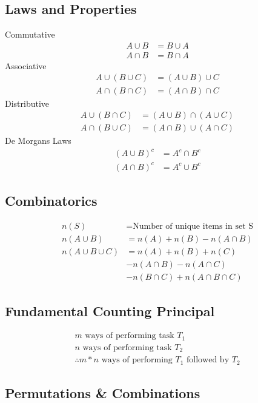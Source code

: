 \documentclass[]{article}
\begin{document}
	\subsection*{Laws and Properties}
	Commutative
	\begin{align*}
		A \cup B &= B \cup A \\
		A \cap B &= B \cap A
	\end{align*}
	Associative
	\begin{align*}
		A \cup (B \cup C) &= (A \cup B) \cup C \\
		A \cap (B \cap C) &= (A \cap B) \cap C
	\end{align*}
	Distributive
	\begin{align*}
		A \cup (B \cap C) &= (A \cup B) \cap (A \cup C) \\
		A \cap (B \cup C) &= (A \cap B) \cup (A \cap C)
	\end{align*}
	De Morgans Laws
	\begin{align*}
		(A \cup B)^c &= A^c \cap B^c \\
		(A \cap B)^c &= A^c \cup B^c
	\end{align*}
	
	\subsection*{Combinatorics}
	\begin{align*}
		n(S) &= \text{Number of unique items in set S} \\
		n(A \cup B) &= n(A) + n(B) - n(A \cap B) \\
		n(A \cup B \cup C) &=  n(A) + n(B) + n(C) \\
										 & - n(A \cap B) - n(A \cap C) \\
										 & - n(B \cap C) + n(A \cap B \cap C)
	\end{align*}

	\subsection*{Fundamental Counting Principal}
	
	\begin{align*}
		m \text{ ways of performing task } T_1 \\
		n \text{ ways of performing task } T_2 \\
		\therefore m * n \text{ ways of performing } T_1 \text{ followed by } T_2
	\end{align*}

	\subsection*{Permutations \& Combinations}
	
\end{document}
